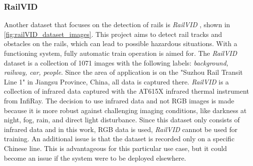 \subsubsection{RailVID}
\label{subsubsec:railVID}
Another dataset that focuses on the detection of rails is \textit{RailVID} \cite{yuan2022railvid}, shown in \autoref{fig:railVID_dataset_images}. This project aims to detect rail tracks and obstacles on the rails, which can lead to possible hazardous situations. With a functioning system, fully automatic train operation is aimed for. The \textit{RailVID} dataset is a collection of 1071 images with the following labels: \textit{background, railway, car, people}. Since the area of application is on the "Suzhou Rail Transit Line 1" in Jiangsu Province, China, all data is captured there. \textit{RailVID} is a collection of infrared data captured with the AT615X infrared thermal instrument from InfiRay. The decision to use infrared data and not RGB images is made because it is more robust against challenging imaging conditions, like darkness at night, fog, rain, and direct light disturbance.
Since this dataset only consists of infrared data and in this work, \ac{RGB} data is used, \textit{RailVID} cannot be used for training. An additional issue is that the dataset is recorded only on a specific Chinese line. This is advantageous for this particular use case, but it could become an issue if the system were to be deployed elsewhere.

